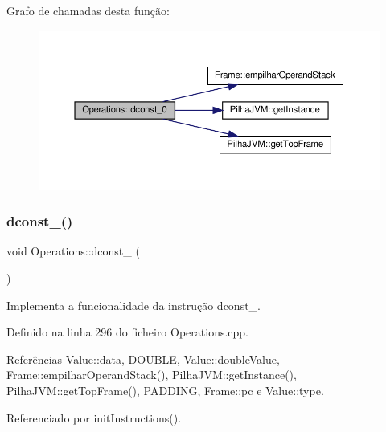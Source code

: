 Grafo de chamadas desta função\+:\nopagebreak
\begin{figure}[H]
\begin{center}
\leavevmode
\includegraphics[width=350pt]{classOperations_abd7f711342c43f7fa4e93b41931e6c86_cgraph}
\end{center}
\end{figure}
\mbox{\label{classOperations_a1a704891f81e3b532bf0eaad94429773}} 
\subsubsection{\texorpdfstring{dconst\+\_()}{dconst\_1()}}
{\footnotesize\ttfamily void Operations\+::dconst\+\_ (\begin{DoxyParamCaption}{ }\end{DoxyParamCaption})\hspace{0.3cm}{\ttfamily [private]}}



Implementa a funcionalidade da instrução dconst\+\_. 



Definido na linha 296 do ficheiro Operations.\+cpp.



Referências Value\+::data, D\+O\+U\+B\+LE, Value\+::double\+Value, Frame\+::empilhar\+Operand\+Stack(), Pilha\+J\+V\+M\+::get\+Instance(), Pilha\+J\+V\+M\+::get\+Top\+Frame(), P\+A\+D\+D\+I\+NG, Frame\+::pc e Value\+::type.



Referenciado por init\+Instructions().

